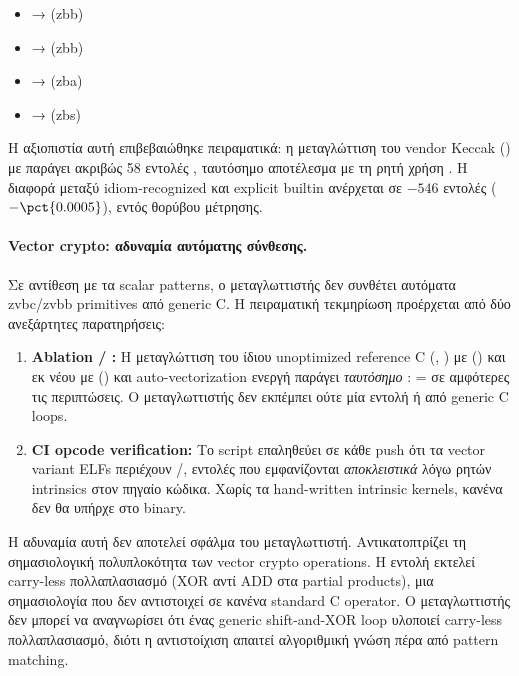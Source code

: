 \begin{itemize}
  \item {} → \rori (\gls{zbb})
  \item {} →  (\gls{zbb})
  \item {} →  (\gls{zba})
  \item {} →  (\gls{zbs})
\end{itemize}

Η αξιοπιστία αυτή επιβεβαιώθηκε πειραματικά: η μεταγλώττιση του vendor
Keccak () με  παράγει
ακριβώς \num{58} εντολές \rori, ταυτόσημο αποτέλεσμα με τη ρητή χρήση
. Η διαφορά \instret μεταξύ idiom-recognized
και explicit builtin ανέρχεται σε $-\num{546}$ εντολές ($-\pct{0.0005}$),
εντός θορύβου μέτρησης.

\paragraph{Vector crypto: αδυναμία αυτόματης σύνθεσης.}
Σε αντίθεση με τα scalar patterns, ο μεταγλωττιστής δεν συνθέτει αυτόματα
\gls{zvbc}/\gls{zvbb} primitives από generic C. Η πειραματική τεκμηρίωση
προέρχεται από δύο ανεξάρτητες παρατηρήσεις:

\begin{enumerate}
  \item \textbf{Ablation  / :}
    Η μεταγλώττιση του ίδιου unoptimized reference C (,
    ) με  ()
    και εκ νέου με 
    () και auto-vectorization ενεργή παράγει
    \emph{ταυτόσημο} \instret:  =  σε
    αμφότερες τις περιπτώσεις. Ο μεταγλωττιστής δεν εκπέμπει ούτε μία εντολή
    \vclmul ή  από generic C loops.

  \item \textbf{CI opcode verification:} Το script
     επαληθεύει σε κάθε push ότι τα vector
    variant ELFs περιέχουν \vclmul/\vclmulh, εντολές που εμφανίζονται
    \emph{αποκλειστικά} λόγω ρητών intrinsics στον πηγαίο κώδικα.
    Χωρίς τα hand-written intrinsic kernels, κανένα \vclmul δεν θα
    υπήρχε στο binary.
\end{enumerate}

Η αδυναμία αυτή δεν αποτελεί σφάλμα του μεταγλωττιστή. Αντικατοπτρίζει τη
σημασιολογική πολυπλοκότητα των vector crypto operations. Η εντολή
\vclmul εκτελεί carry-less πολλαπλασιασμό (XOR αντί ADD στα partial
products), μια σημασιολογία που δεν αντιστοιχεί σε κανένα standard C
operator. Ο μεταγλωττιστής δεν μπορεί να αναγνωρίσει ότι ένας generic
shift-and-XOR loop υλοποιεί carry-less πολλαπλασιασμό, διότι η
αντιστοίχιση απαιτεί αλγοριθμική γνώση πέρα από pattern matching.

